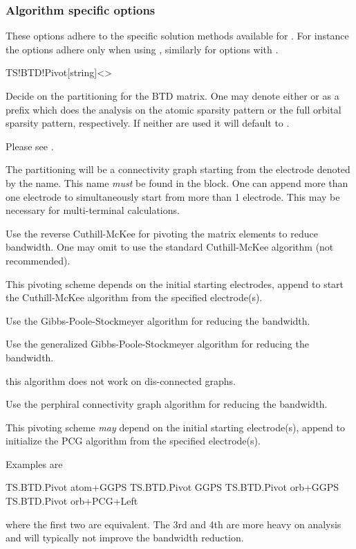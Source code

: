 \subsubsection{Algorithm specific options}

These options adhere to the specific solution methods available for
\tsiesta. For instance the  options adhere only when
using , similarly for options with
.

\begin{fdfentry}{TS!BTD!Pivot}[string]<>

  Decide on the partitioning for the BTD matrix. One may denote either
   or  as a prefix which does the analysis on
  the atomic sparsity pattern or the full orbital sparsity pattern,
  respectively. If neither are used it will default to .

  Please see .

  \begin{fdfoptions}

    The partitioning will be a connectivity graph starting from the
    electrode denoted by the name. This name \emph{must} be found in
    the  block. One can append more than one electrode
    to simultaneously start from more than 1 electrode. This may be
    necessary for multi-terminal calculations.

    \option[rev-CM] %
    Use the reverse Cuthill-McKee for pivoting the matrix elements to
    reduce bandwidth. One may omit  to use the standard
    Cuthill-McKee algorithm (not recommended).

    This pivoting scheme depends on the initial starting
    electrodes, append  to start the Cuthill-McKee
    algorithm from the specified electrode(s).

    \option[GPS] %
    Use the Gibbs-Poole-Stockmeyer algorithm for reducing the
    bandwidth.

    \option[GGPS] %
    Use the generalized Gibbs-Poole-Stockmeyer algorithm for reducing
    the bandwidth.

    \note this algorithm does not work on dis-connected graphs.

    \option[PCG] %
    Use the perphiral connectivity graph algorithm for reducing the
    bandwidth.

    This pivoting scheme \emph{may} depend on the initial starting
    electrode(s), append  to initialize the PCG
    algorithm from the specified electrode(s).

  \end{fdfoptions}

  Examples are
  \begin{fdfexample}
    TS.BTD.Pivot atom+GGPS
    TS.BTD.Pivot GGPS
    TS.BTD.Pivot orb+GGPS
    TS.BTD.Pivot orb+PCG+Left
  \end{fdfexample}
  where the first two are equivalent. The 3rd and 4th are more heavy
  on analysis and will typically not improve the bandwidth reduction.
  
\end{fdfentry}

